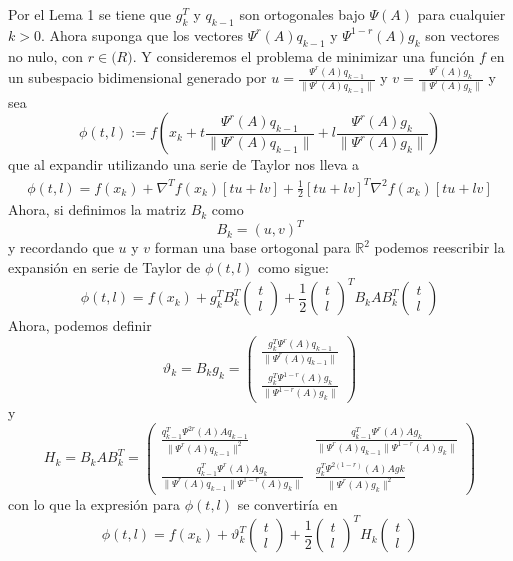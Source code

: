 \par Por el Lema 1 se tiene que $g_k^T$  y $q_{k-1}$ son ortogonales bajo $\Psi(A)$ para cualquier $k>0$. Ahora suponga que los vectores $\Psi^r(A)q_{k-1}$ y $\Psi^{1-r}(A)g_k$ son vectores no nulo, con $r\in \mathbb(R)$. Y consideremos el problema de minimizar una función $f$ en un subespacio bidimensional generado por $ u = \frac{\Psi^r(A)q_{k-1}}{\|\Psi^r(A)q_{k-1}\|}$ y $v = \frac{\Psi^r(A)g_{k}}{\|\Psi^r(A)g_{k}\|}$ y sea
$$
\phi(t,l):=f\left(x_k+t\frac{\Psi^r(A)q_{k-1}}{\|\Psi^r(A)q_{k-1}\|} + l \frac{\Psi^r(A)g_{k}}{\|\Psi^r(A)g_{k}\|}\right)
$$
que al expandir utilizando una serie de Taylor nos lleva a
\begin{align*}
	\phi(t,l) = f(x_k)+\nabla^T f(x_k) \left[tu+lv \right] + \frac{1}{2}\left[tu+ lv \right]^T\nabla^2 f(x_k) \left[tu+lv \right] 
\end{align*}
Ahora, si definimos la matriz $B_k$ como
$$
	B_k =  \left(u, v\right)^T
$$
y recordando que $u$ y $v$ forman una base ortogonal para $\mathbb{R}^2$ podemos reescribir la expansión en serie de Taylor de $\phi(t, l)$ como sigue:
$$
\phi(t, l) =  f(x_k)+g_k^TB_k^T\begin{pmatrix}t\\l\end{pmatrix} +\frac{1}{2}\begin{pmatrix}t\\l\end{pmatrix}^TB_k A B_k^T\begin{pmatrix}t\\l\end{pmatrix}
$$
Ahora, podemos definir
$$
\vartheta_k = B_kg_k = \begin{pmatrix}\frac{g_k^T\Psi^r(A)q_{k-1}}{\|\Psi^{r}(A)q_{k-1}\|}\\
\frac{g_k^T\Psi^{1-r}(A)g_k}{\|\Psi^{1-r}(A)g_k\|}\end{pmatrix}
$$
y 
$$
H_k = B_kAB_k^T =\begin{pmatrix}
	\frac{q_{k-1}^T\Psi^{2r}(A)Aq_{k-1}}{\|\Psi^{r}(A)q_{k-1}\|^2} & \frac{q_{k-1}^T\Psi^r(A)Ag_{k}}{\|\Psi^{r}(A)q_{k-1}\|\Psi^{1-r}(A)g_k\| }\\
	\frac{q_{k-1}^T\Psi^r(A)Ag_{k}}{\|\Psi^{r}(A)q_{k-1}\|\Psi^{1-r}(A)g_k\| } & 
	\frac{g_k^T\Psi^{2(1-r)}(A)Ag{k}}{\|\Psi^{r}(A)g_k\|^2} 
\end{pmatrix} 
$$
con lo que la expresión para $\phi(t, l)$ se convertiría en
$$
\phi(t, l) =  f(x_k)+\vartheta_k^T\begin{pmatrix}t\\l\end{pmatrix} +\frac{1}{2}\begin{pmatrix}t\\l\end{pmatrix}^T H_k\begin{pmatrix}t\\l\end{pmatrix}
$$
